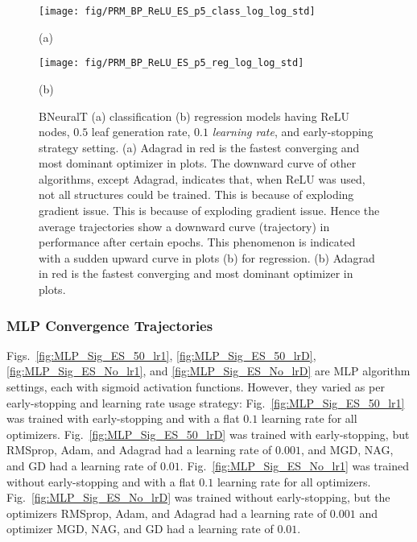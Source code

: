\documentclass[11pt,a4paper]{article}
\begin{document}
\begin{figure}
        \centering
        \texttt{[image: fig/PRM\_BP\_ReLU\_ES\_p5\_class\_log\_log\_std]}


        (a)
        
        \centering
        \texttt{[image: fig/PRM\_BP\_ReLU\_ES\_p5\_reg\_log\_log\_std]}
        
        (b)
        \caption{BNeuralT (a) classification (b) regression models having ReLU nodes, $0.5$ leaf generation rate, $0.1$ \textit{learning rate}, and early-stopping strategy setting.
        (a) Adagrad in red is the fastest converging and most dominant  optimizer in plots. The downward curve of other algorithms, except Adagrad, indicates that, when ReLU was used, not all structures could be trained. This is because of exploding gradient issue. This is because of exploding gradient issue. Hence the average trajectories show a downward curve (trajectory) in performance after certain epochs. This phenomenon is indicated with a sudden upward curve in plots (b) for regression. (b) Adagrad in red is the fastest converging and most dominant optimizer in plots.
\label{fig:PRM_BP_ReLU_ES_p5}}
    \end{figure}
    
    \clearpage
\subsubsection{MLP Convergence Trajectories}
    Figs.~\ref{fig:MLP_Sig_ES_50_lr1},
    \ref{fig:MLP_Sig_ES_50_lrD}, 
    \ref{fig:MLP_Sig_ES_No_lr1}, and 
    \ref{fig:MLP_Sig_ES_No_lrD}
    are MLP algorithm settings, each with sigmoid activation functions. However, they  varied as per early-stopping and learning rate usage strategy:
Fig.~\ref{fig:MLP_Sig_ES_50_lr1} was trained with early-stopping and with a flat $0.1$ learning rate for all optimizers. 
Fig.~\ref{fig:MLP_Sig_ES_50_lrD} was trained with early-stopping, but  RMSprop, Adam, and Adagrad had a learning rate of $0.001$, and MGD, NAG, and GD  had a learning rate of $0.01$.
Fig.~\ref{fig:MLP_Sig_ES_No_lr1} was trained without early-stopping and with a flat $0.1$ learning rate for all optimizers. 
Fig.~\ref{fig:MLP_Sig_ES_No_lrD} was trained without early-stopping, but the optimizers RMSprop, Adam, and Adagrad had a learning rate of $0.001$ and optimizer MGD, NAG, and GD  had a learning rate of $0.01$.
    
\end{document}
